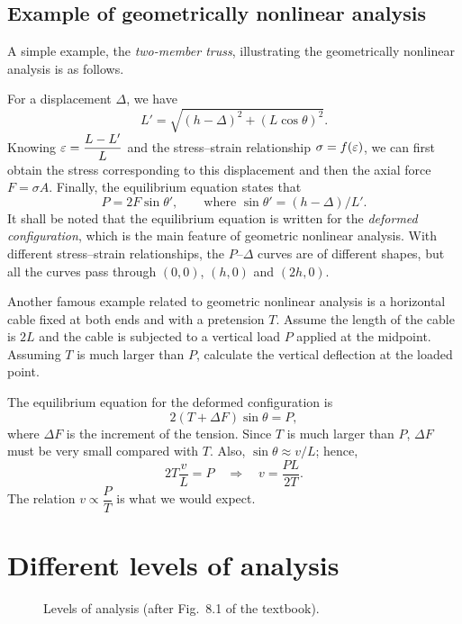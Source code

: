 \subsection*{Example of geometrically nonlinear analysis}
A simple example, the \emph{two-member truss}, illustrating the geometrically nonlinear analysis is as follows.
\begin{fig}
  
\end{fig}

\begin{solution}
For a displacement $\Delta$, we have
\begin{equation}
  L' = \sqrt{(h-\Delta)^2 + (L\cos\theta)^2}.
\end{equation}
Knowing $\varepsilon = \dfrac{L-L'}{L}$ and the stress--strain relationship $\sigma = f(\varepsilon)$, we can first obtain the stress corresponding to this displacement and then the axial force $F = \sigma A$. Finally, the equilibrium equation states that
\begin{equation}
  P = 2F\sin\theta', \qquad \text{where } \sin\theta' = (h-\Delta)/L'.
\end{equation}
It shall be noted that the equilibrium equation is written for the \emph{deformed configuration}, which is the main feature of geometric nonlinear analysis. With different stress--strain relationships, the $P$--$\Delta$ curves are of different shapes, but all the curves pass through $(0,0)$, $(h,0)$ and $(2h,0)$.
\end{solution}
\begin{fig}
  
\end{fig}

Another famous example related to geometric nonlinear analysis is a horizontal cable fixed at both ends and with a pretension $T$. Assume the length of the cable is $2L$ and the cable is subjected to a vertical load $P$ applied at the midpoint. Assuming $T$ is much larger than $P$, calculate the vertical deflection at the loaded point.
\begin{fig}
  
\end{fig}

\begin{solution}
The equilibrium equation for the deformed configuration is
\begin{equation}
  2(T+\Delta F)\sin\theta = P,
\end{equation}
where $\Delta F$ is the increment of the tension. Since $T$ is much larger than $P$, $\Delta F$ must be very small compared with $T$. Also, $\sin\theta \approx v/L$; hence,
\begin{equation}
  2T\frac{v}{L} = P \quad\Longrightarrow\quad v = \frac{PL}{2T}.
\end{equation}
The relation $v \propto \dfrac{P}{T}$ is what we would expect.
\end{solution}

\section{Different levels of analysis}
\begin{figure}[H]
  \centering
  
  \caption{Levels of analysis (after Fig.~8.1 of the textbook).}
\end{figure}
